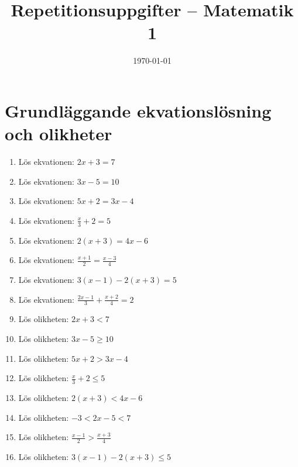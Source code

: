 \documentclass[a4paper,11pt]{article}
\title{Repetitionsuppgifter -- Matematik 1}
\author{}
\date{\today}
\begin{document}
\maketitle

\section*{Grundläggande ekvationslösning och olikheter}

\begin{enumerate}[label=\textbf{\arabic*.}]
    \item Lös ekvationen: $2x + 3 = 7$
    
    \item Lös ekvationen: $3x - 5 = 10$
    
    \item Lös ekvationen: $5x + 2 = 3x - 4$
    
    \item Lös ekvationen: $\frac{x}{3} + 2 = 5$
    
    \item Lös ekvationen: $2(x + 3) = 4x - 6$
    
    \item Lös ekvationen: $\frac{x+1}{2} = \frac{x-3}{4}$
    
    \item Lös ekvationen: $3(x - 1) - 2(x + 3) = 5$
    
    \item Lös ekvationen: $\frac{2x-1}{3} + \frac{x+2}{4} = 2$
    
    \item Lös olikheten: $2x + 3 < 7$
    
    \item Lös olikheten: $3x - 5 \geq 10$
    
    \item Lös olikheten: $5x + 2 > 3x - 4$
    
    \item Lös olikheten: $\frac{x}{3} + 2 \leq 5$
    
    \item Lös olikheten: $2(x + 3) < 4x - 6$
    
    \item Lös olikheten: $-3 < 2x - 5 < 7$
    
    \item Lös olikheten: $\frac{x-1}{2} > \frac{x+3}{4}$
    
    \item Lös olikheten: $3(x - 1) - 2(x + 3) \leq 5$
\end{enumerate}
\end{document}
